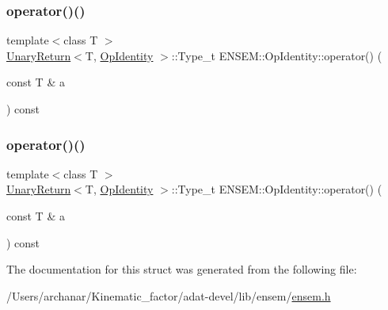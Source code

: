 \mbox{\label{structENSEM_1_1OpIdentity_a4ff09949750390fcf0e8f6a85b20a1ec}} 
\subsubsection{\texorpdfstring{operator()()}{operator()()}\hspace{0.1cm}{\footnotesize\ttfamily [2/3]}}
{\footnotesize\ttfamily template$<$class T $>$ \\
\mbox{\hyperlink{structENSEM_1_1UnaryReturn}{Unary\+Return}}$<$T, \mbox{\hyperlink{structENSEM_1_1OpIdentity}{Op\+Identity}} $>$\+::Type\+\_\+t E\+N\+S\+E\+M\+::\+Op\+Identity\+::operator() (\begin{DoxyParamCaption}\item[{const T \&}]{a }\end{DoxyParamCaption}) const\hspace{0.3cm}{\ttfamily [inline]}}

\mbox{\label{structENSEM_1_1OpIdentity_a4ff09949750390fcf0e8f6a85b20a1ec}} 
\subsubsection{\texorpdfstring{operator()()}{operator()()}\hspace{0.1cm}{\footnotesize\ttfamily [3/3]}}
{\footnotesize\ttfamily template$<$class T $>$ \\
\mbox{\hyperlink{structENSEM_1_1UnaryReturn}{Unary\+Return}}$<$T, \mbox{\hyperlink{structENSEM_1_1OpIdentity}{Op\+Identity}} $>$\+::Type\+\_\+t E\+N\+S\+E\+M\+::\+Op\+Identity\+::operator() (\begin{DoxyParamCaption}\item[{const T \&}]{a }\end{DoxyParamCaption}) const\hspace{0.3cm}{\ttfamily [inline]}}



The documentation for this struct was generated from the following file\+:\begin{DoxyCompactItemize}
\item 
/\+Users/archanar/\+Kinematic\+\_\+factor/adat-\/devel/lib/ensem/\mbox{\hyperlink{adat-devel_2lib_2ensem_2ensem_8h}{ensem.\+h}}\end{DoxyCompactItemize}
